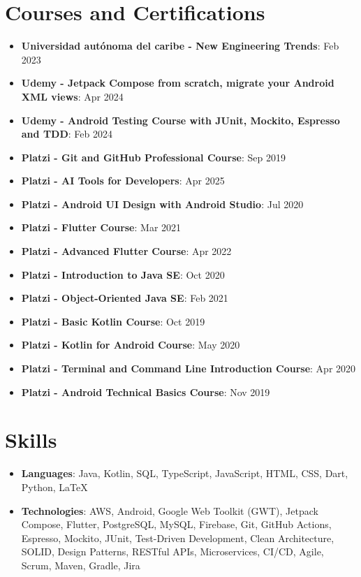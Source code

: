 \documentclass[letterpaper,11pt]{article}
\newcommand{\resumeItem}[2]{
  \item\small{
    \textbf{#1}{: #2 \vspace{-2pt}}
  }
}
\newcommand{\resumeSubItem}[2]{\resumeItem{#1}{#2}\vspace{-4pt}}
\newcommand{\resumeSubHeadingListStart}{\begin{itemize}[leftmargin=*]}
\newcommand{\resumeSubHeadingListEnd}{\end{itemize}}
\begin{document}
\section{Courses and Certifications}
\resumeSubHeadingListStart
\resumeSubItem{Universidad autónoma del caribe - New Engineering Trends}{Feb 2023}
\resumeSubItem{Udemy - Jetpack Compose from scratch, migrate your Android XML views}{Apr 2024}
\resumeSubItem{Udemy - Android Testing Course with JUnit, Mockito, Espresso and TDD}{Feb 2024}
\resumeSubItem{Platzi - Git and GitHub Professional Course}{Sep 2019}
\resumeSubItem{Platzi - AI Tools for Developers}{Apr 2025}
\resumeSubItem{Platzi - Android UI Design with Android Studio}{Jul 2020}
\resumeSubItem{Platzi - Flutter Course}{Mar 2021}
\resumeSubItem{Platzi - Advanced Flutter Course}{Apr 2022}
\resumeSubItem{Platzi - Introduction to Java SE}{Oct 2020}
\resumeSubItem{Platzi - Object-Oriented Java SE}{Feb 2021}
\resumeSubItem{Platzi - Basic Kotlin Course}{Oct 2019}
\resumeSubItem{Platzi - Kotlin for Android Course}{May 2020}
\resumeSubItem{Platzi - Terminal and Command Line Introduction Course}{Apr 2020}
\resumeSubItem{Platzi - Android Technical Basics Course}{Nov 2019}
\resumeSubHeadingListEnd

\section{Skills}
\resumeSubHeadingListStart
\item{
            \textbf{Languages}{: Java, Kotlin, SQL, TypeScript, JavaScript, HTML, CSS, Dart, Python, LaTeX}
            
      }
\item {
            \textbf{Technologies}{: AWS, Android, Google Web Toolkit (GWT), Jetpack Compose, Flutter, PostgreSQL, MySQL, Firebase, Git, GitHub Actions, Espresso, Mockito, JUnit, Test-Driven Development, Clean Architecture, SOLID, Design Patterns, RESTful APIs, Microservices, CI/CD, Agile, Scrum, Maven, Gradle, Jira}
      }
\resumeSubHeadingListEnd


\end{document}
